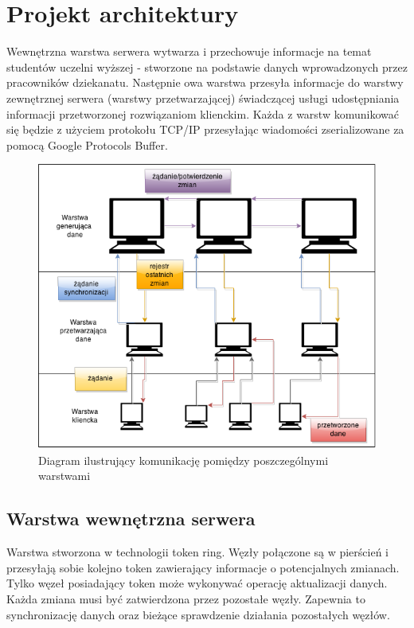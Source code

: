\section[Projekt architektury]{Projekt architektury}

\par{Wewnętrzna warstwa serwera wytwarza i przechowuje informacje na temat studentów uczelni wyższej - stworzone na podstawie danych wprowadzonych przez pracowników dziekanatu. Następnie owa warstwa przesyła informacje do warstwy zewnętrznej serwera (warstwy przetwarzającej) świadczącej usługi udostępniania informacji przetworzonej rozwiązaniom klienckim. Każda z warstw komunikować się będzie z użyciem protokołu TCP/IP przesyłając wiadomości zserializowane za pomocą Google Protocols Buffer.}

\begin{figure}[h!tb]
\begin{center}
\includegraphics[width=0.9\linewidth]{img/dane_net.png} 
\caption{Diagram ilustrujący komunikację pomiędzy poszczególnymi warstwami}
\label{img:dane_net}
\end{center}
\end{figure}

\subsection[Warstwa wewnętrzna serwera][Warstwa wewnętrzna serwera]{Warstwa wewnętrzna serwera}

\par{Warstwa stworzona w technologii token ring. Węzły połączone są w pierścień i przesyłają sobie kolejno token zawierający informacje o potencjalnych zmianach. Tylko węzeł posiadający token może wykonywać operację aktualizacji danych. Każda zmiana musi być zatwierdzona przez pozostałe węzły. Zapewnia to synchronizację danych oraz bieżące sprawdzenie działania pozostałych węzłów.}


